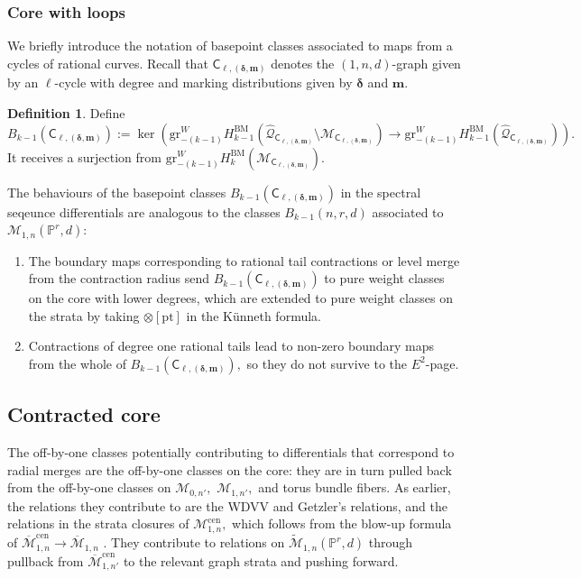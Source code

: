 \documentclass[12pt,reqno]{amsart}
\theoremstyle{definition}
\theoremstyle{definition}
\theoremstyle{definition}
\theoremstyle{definition}
\newtheorem{definition}[theorem]{Definition}
\newcommand{\ol}[1]{\overline{#1}}
\newcommand{\PP}{\mathbb{P}}
\newcommand{\Mcal}{\mathcal{M}}
\newcommand{\Mbar}{\ol{\Mcal}}
\newcommand{\Mtil}{\widetilde{\mathcal{M}}}
\newcommand{\gr}{\mathrm{gr}}
\begin{document}
\subsubsection{Core with loops}\label{subsec:baseptloops}
We briefly introduce the notation of basepoint classes associated to maps from a cycles of rational curves. Recall that $\mathsf{C}_{\ell,(\boldsymbol{\delta},\boldsymbol{m})}$ denotes the $(1,n,d)$-graph given by an $\ell$-cycle with degree and marking distributions given by $\boldsymbol{\delta}$ and $\boldsymbol{m}.$

\begin{definition}
  Define $$B_{k-1}(\mathsf{C}_{\ell,(\boldsymbol{\delta},\boldsymbol{m})}):= \ker(\gr^W_{-(k-1)}H_{k-1}^{\mathrm{BM}}(\hat{\mathcal{Q}}_{\mathsf{C}_{\ell,(\boldsymbol{\delta},\boldsymbol{m})}}\setminus \mathcal{M}_{\mathsf{C}_{\ell,(\boldsymbol{\delta},\boldsymbol{m})}})\to \gr^W_{-(k-1)}H_{k-1}^{\mathrm{BM}}(\hat{\mathcal{Q}}_{\mathsf{C}_{\ell,(\boldsymbol{\delta},\boldsymbol{m})}})).$$ It receives a surjection from $\gr^W_{-(k-1)}H_k^{\mathrm{BM}}(\mathcal{M}_{\mathsf{C}_{\ell,(\boldsymbol{\delta},\boldsymbol{m})}}).$
\end{definition}

The behaviours of the basepoint classes $B_{k-1}(\mathsf{C}_{\ell,(\boldsymbol{\delta},\boldsymbol{m})})$ in the spectral seqeunce differentials are analogous to the classes $B_{k-1}(n,r,d)$ associated to $\mathcal{M}_{1,n}(\PP^r,d)$:\begin{enumerate}
  \item The boundary maps corresponding to rational tail contractions or level merge from the contraction radius send $B_{k-1}(\mathsf{C}_{\ell,(\boldsymbol{\delta},\boldsymbol{m})})$ to pure weight classes on the core with lower degrees, which are extended to pure weight classes on the strata by taking $\otimes [\mathrm{pt}]$ in the Künneth formula.
  \item Contractions of degree one rational tails lead to non-zero boundary maps from the whole of $B_{k-1}(\mathsf{C}_{\ell,(\boldsymbol{\delta},\boldsymbol{m})}),$ so they do not survive to the $E^2$-page.
\end{enumerate}

\subsection{Contracted core}
The off-by-one classes potentially contributing to differentials that correspond to radial merges are the off-by-one classes on the core: they are in turn pulled back from the off-by-one classes on $\mathcal{M}_{0,n'},$ $\mathcal{M}_{1,n'},$ and torus bundle fibers. As earlier, the relations they contribute to are the WDVV and Getzler's relations, and the relations in the strata closures of $\mathcal{M}_{1,n}^{\mathrm{cen}},$ which follows from the blow-up formula of $\Mbar_{1,n}^{\mathrm{cen}}\to \Mbar_{1,n}$ \cite{rspw}. They contribute to relations on $\Mtil_{1,n}(\PP^r,d)$ through pullback from $\Mbar_{1,n'}^{\mathrm{cen}}$ to the relevant graph strata and pushing forward.
\end{document}
